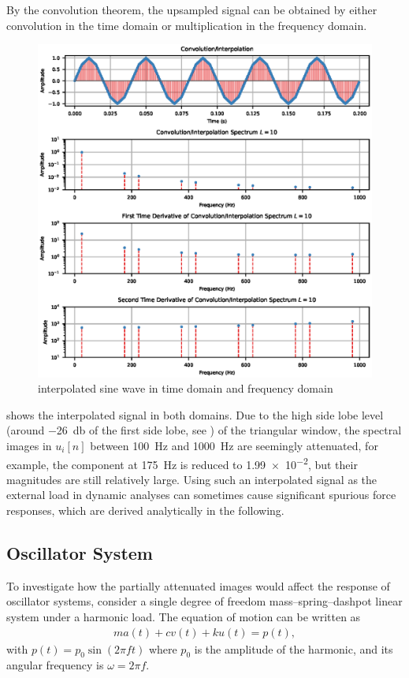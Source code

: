 By the convolution theorem, the upsampled signal can be obtained by either convolution in the time domain or multiplication in the frequency domain.
\begin{figure}[htb!]
\centering
\includegraphics{PIC/Convolution}
\caption{interpolated sine wave in time domain and frequency domain}\label{fig:interpolated}
\end{figure}
 shows the interpolated signal in both domains. Due to the high side lobe level (around \SI{-26}{\decibel} of the first side lobe, see ) of the triangular window, the spectral images in $u_i[n]$ between \SI{100}{\hertz} and \SI{1000}{\hertz} are seemingly attenuated, for example, the component at \SI{175}{\hertz} is reduced to \num{1.99e-2}, but their magnitudes are still relatively large. Using such an interpolated signal as the external load in dynamic analyses can sometimes cause significant spurious force responses, which are derived analytically in the following.
\subsection{Oscillator System}
To investigate how the partially attenuated images would affect the response of oscillator systems, consider a single degree of freedom mass--spring--dashpot linear system under a harmonic load. The equation of motion can be written as
\begin{gather}
ma\left(t\right)+cv\left(t\right)+ku\left(t\right)=p\left(t\right),
\end{gather}
with $p\left(t\right)=p_0\sin\left(2\pi{}ft\right)$ where $p_0$ is the amplitude of the harmonic, and its angular frequency is $\omega=2\pi{}f$.

